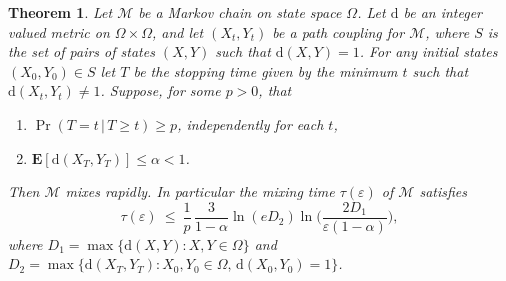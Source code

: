 \documentclass[11pt]{article}
\newtheorem{thm}{Theorem}[section]
\theoremstyle{definition}
\theoremstyle{remark}
\newcommand{\eps}{\varepsilon}
\newcommand{\e}{\mathbf{E}}
\newcommand{\M}{\mathcal{M}}
\begin{document}
\begin{thm}\label{stopping}
Let $\M$ be a Markov chain on state space $\Omega$. Let $\mathrm{d}$ be an integer
valued metric on $\Omega\times \Omega$, and let $(X_t,Y_t)$ be a
path coupling for $\M$, where $S$ is the set of pairs of states $(X,Y)$ such that $\mathrm{d}(X,Y)=1$.
For any initial states $(X_0,Y_0)\in S$ 
let $T$ be the stopping time given by the minimum $t$ such that
$\mathrm{d}(X_t,Y_t)\neq1$. Suppose, for some $p>0$, that
\begin{enumerate}
\item $\Pr(T=t\, |\, T\geq t)\geq p$, independently for each $t$,%
\item $\e[\mathrm{d}(X_T,Y_T)]\leq \alpha < 1$.
\end{enumerate}
Then $\M$ mixes rapidly. In particular the mixing time
$\tau(\eps)$ of $\M$ satisfies
\[\tau(\eps)\ \leq\
\frac{1}{p}\,\frac{3}{1-\alpha} \ln (e
D_2)\ln\Big(\frac{2D_1}{\eps(1-\alpha)}\Big),\]%
where $D_1=\max\{\mathrm{d}(X,Y):X,Y\in\Omega\}$ and
$D_2=\max\{\mathrm{d}(X_T,Y_T):X_0,Y_0\in\Omega,\,
\mathrm{d}(X_0,Y_0)=1\}$.
\end{thm}
\end{document}
